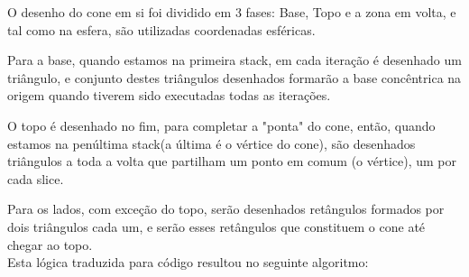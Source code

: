 \documentclass[a4paper]{article}
\begin{document}
O desenho do cone em si foi dividido em 3 fases: Base, Topo e a zona em volta, e tal como na esfera, são utilizadas coordenadas esféricas.

Para a base, quando estamos na primeira stack, em cada iteração é desenhado um triângulo, e conjunto destes triângulos desenhados formarão a base concêntrica na origem quando tiverem sido executadas todas as iterações.

O topo é desenhado no fim, para completar a "ponta" do cone, então, quando estamos na penúltima stack(a última é o vértice do cone), são desenhados triângulos a toda a volta que partilham um ponto em comum (o vértice), um por cada slice.

Para os lados, com exceção do topo, serão desenhados retângulos formados por dois triângulos cada um, e serão esses retângulos que constituem o cone até chegar ao topo.
\\
Esta lógica traduzida para código resultou no seguinte algoritmo:
\\
\end{document}
